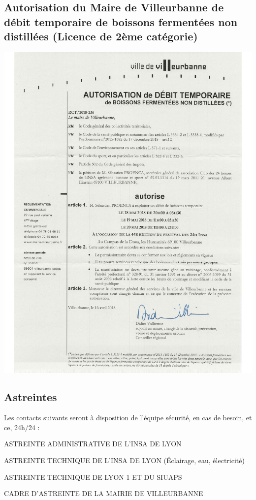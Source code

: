 \documentclass[hidelinks, paper=a4, fontsize=13pt]{report}
\begin{document}
\subsection{Autorisation du Maire de Villeurbanne de débit temporaire de boissons fermentées non distillées (Licence de 2ème catégorie)}
\begin{center}
	\includegraphics[page=1,scale=0.7]{Annexes/Documents/DebitdeBoisson}
	\label{refVentGS}
\end{center}

\subsection{Astreintes}


Les contacts suivants seront à disposition de l’équipe sécurité, en cas de besoin, et ce, 24h/24 : 
\begin{list}{•}{}
	\item ASTREINTE ADMINISTRATIVE DE L’INSA DE LYON 
	\item ASTREINTE TECHNIQUE DE L’INSA DE LYON (Éclairage, eau, électricité)
	\item ASTREINTE TECHNIQUE DE LYON 1 ET DU SIUAPS
	\item CADRE D’ASTREINTE DE LA MAIRIE DE VILLEURBANNE
\end{list}
\end{document}
